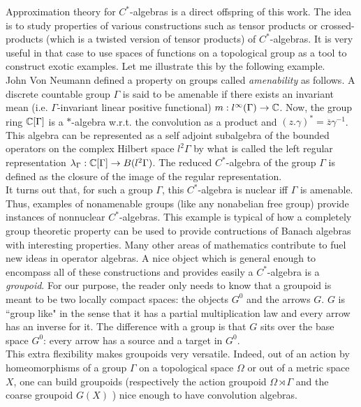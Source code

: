 Approximation theory for $C^*$-algebras is a direct offspring of this work. The idea is to study properties of various constructions such as tensor products or crossed-products (which is a twisted version of tensor products) of $C^*$-algebras. It is very useful in that case to use spaces of functions on a topological group as a tool to construct exotic examples. Let me illustrate this by the following example.\\

John Von Neumann defined a property on groups called \textit{amenability} as follows. A discrete countable group $\Gamma$ is said to be amenable if there exists an invariant mean (i.e. $\Gamma$-invariant linear positive functional) $m: l^\infty(\Gamma)\rightarrow \mathbb{C}$. Now, the group ring $\mathbb{C}[\Gamma]$ is a $*$-algebra w.r.t. the convolution as a product and $(z. \gamma)^* = \overline{z}\gamma^{-1}$. This algebra can be represented as a self adjoint subalgebra of the bounded operators on the complex Hilbert space $l^2\Gamma$ by what is called the left regular representation $\lambda_\Gamma: \mathbb{C}[\Gamma]\rightarrow B(l^2\Gamma)$. The reduced $C^*$-algebra of the group $\Gamma$ is defined as the closure of the image of the regular representation.\\

It turns out that, for such a group $\Gamma$, this $C^*$-algebra is nuclear iff $\Gamma$ is amenable. Thus, examples of nonamenable groups (like any nonabelian free group) provide instances of nonnuclear $C^*$-algebras. This example is typical of how a completely group theoretic property can be used to provide contructions of Banach algebras with interesting properties. Many other areas of mathematics contribute to fuel new ideas in operator algebras. A nice object which is general enough to encompass all of these constructions and provides easily a $C^*$-algebra is a \textit{groupoid}. For our purpose, the reader only needs to know that a groupoid is meant to be two locally compact spaces: the objects $G^0$ and the arrows $G$. $G$ is ``group like" in the sense that it has a partial multiplication law and every arrow has an inverse for it. The difference with a group is that $G$ sits over the base space $G^0$: every arrow has a source and a target in $G^0$.\\  

This extra flexibility makes groupoids very versatile. Indeed, out of an action by homeomorphisms of a group $\Gamma$ on a topological space $\Omega$ or out of a metric space $X$, one can build groupoids (respectively the action groupoid $\Omega \rtimes \Gamma$ and the coarse groupoid $G(X)$ \cite{SkTuYu}) nice enough to have convolution algebras. \\  

